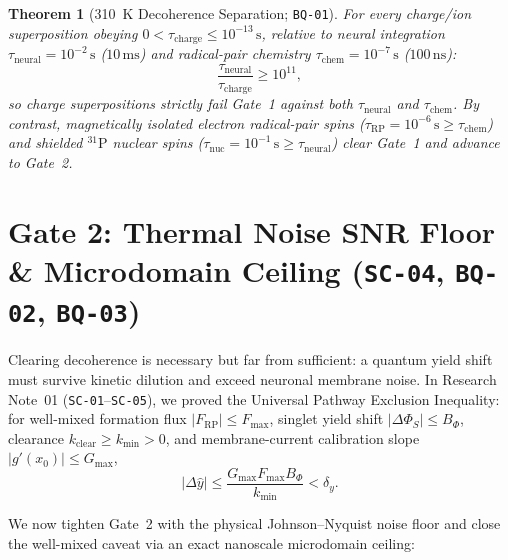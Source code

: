 \documentclass[11pt,a4paper]{article}
\theoremstyle{plain}
\newtheorem{theorem}{Theorem}[section]
\theoremstyle{remark}
\newcommand{\code}[1]{\texttt{\small #1}}
\begin{document}
\begin{theorem}[310~K Decoherence Separation; \code{BQ-01}]
For every charge/ion superposition obeying $0 < \tau_{\mathrm{charge}} \le 10^{-13}\,\mathrm{s}$, relative to neural integration $\tau_{\mathrm{neural}} = 10^{-2}\,\mathrm{s}$ ($10\,\mathrm{ms}$) and radical-pair chemistry $\tau_{\mathrm{chem}} = 10^{-7}\,\mathrm{s}$ ($100\,\mathrm{ns}$):
\begin{equation}
  \frac{\tau_{\mathrm{neural}}}{\tau_{\mathrm{charge}}} \ge 10^{11},
\end{equation}
so charge superpositions strictly fail Gate~1 against both $\tau_{\mathrm{neural}}$ and $\tau_{\mathrm{chem}}$. By contrast, magnetically isolated electron radical-pair spins ($\tau_{\mathrm{RP}} = 10^{-6}\,\mathrm{s} \ge \tau_{\mathrm{chem}}$) and shielded $^{31}\mathrm{P}$ nuclear spins ($\tau_{\mathrm{nuc}} = 10^{-1}\,\mathrm{s} \ge \tau_{\mathrm{neural}}$) clear Gate~1 and advance to Gate~2.
\end{theorem}

\section{Gate 2: Thermal Noise SNR Floor \& Microdomain Ceiling (\code{SC-04}, \code{BQ-02}, \code{BQ-03})}

Clearing decoherence is necessary but far from sufficient: a quantum yield shift must survive kinetic dilution and exceed neuronal membrane noise. In Research Note~01 (\code{SC-01}--\code{SC-05}), we proved the Universal Pathway Exclusion Inequality: for well-mixed formation flux $|F_{\mathrm{RP}}| \le F_{\max}$, singlet yield shift $|\Delta\Phi_S| \le B_\Phi$, clearance $k_{\mathrm{clear}} \ge k_{\min} > 0$, and membrane-current calibration slope $|g'(x_0)| \le G_{\max}$,
\begin{equation}
  |\Delta\hat{y}| \le \frac{G_{\max} F_{\max} B_\Phi}{k_{\min}} < \delta_y.
\end{equation}

We now tighten Gate~2 with the physical Johnson--Nyquist noise floor and close the well-mixed caveat via an exact nanoscale microdomain ceiling:
\end{document}
